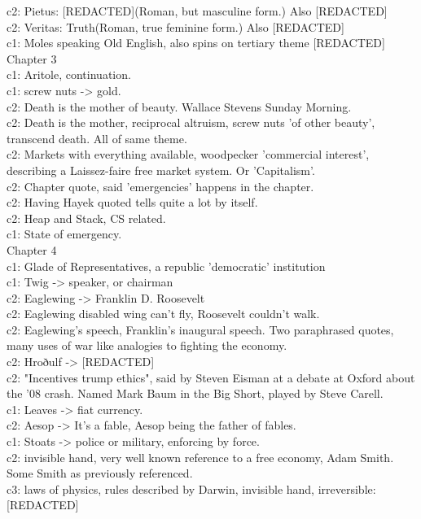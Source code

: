 c2: Pietus: [REDACTED](Roman, but masculine form.) Also [REDACTED]\\
c2: Veritas: Truth(Roman, true feminine form.) Also [REDACTED]\\
c1: Moles speaking Old English, also spins on tertiary theme [REDACTED]\\
Chapter 3\\[0.1cm]
c1: Aritole, continuation.\\
c1: screw nuts -> gold.\\
c2: Death is the mother of beauty. Wallace Stevens Sunday Morning.\\
c2: Death is the mother, reciprocal altruism, screw nuts 'of other beauty', transcend death. All of same theme.\\
c2: Markets with everything available, woodpecker 'commercial interest', describing a Laissez-faire free market system. Or 'Capitalism'.\\
c2: Chapter quote, said 'emergencies' happens in the chapter.\\
c2: Having Hayek quoted tells quite a lot by itself.\\
c2: Heap and Stack, CS related.\\
c1: State of emergency.\\
Chapter 4\\[0.1cm]
c1: Glade of Representatives, a republic 'democratic' institution\\
c1: Twig -> speaker, or chairman\\
c2: Eaglewing -> Franklin D. Roosevelt\\
c2: Eaglewing disabled wing can't fly, Roosevelt couldn't walk.\\
c2: Eaglewing's speech, Franklin's inaugural speech. Two paraphrased quotes, many uses of war like analogies to fighting the economy.\\
c2: Hroðulf -> [REDACTED]\\
c2: "Incentives trump ethics", said by Steven Eisman at a debate at Oxford about the '08 crash. Named Mark Baum in the Big Short, played by Steve Carell.\\
c1: Leaves -> fiat currency.\\
c2: Aesop -> It's a fable, Aesop being the father of fables.\\
c1: Stoats -> police or military, enforcing by force.\\
c2: invisible hand, very well known reference to a free economy, Adam Smith. Some Smith as previously referenced.\\
c3: laws of physics, rules described by Darwin, invisible hand, irreversible: [REDACTED]\\
